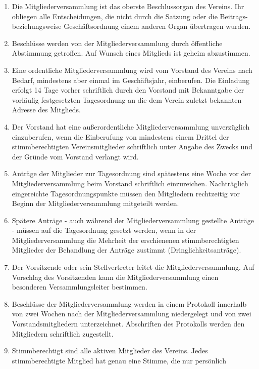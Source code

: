 \documentclass[german]{article}
\begin{document}
\begin{enumerate}
\def\labelenumi{\arabic{enumi}.}
\item
  Die Mitgliederversammlung ist das oberste Beschlussorgan des Vereins.
  Ihr obliegen alle Entscheidungen, die nicht durch die Satzung oder die
  Beitrags- beziehungsweise Geschäftsordnung einem anderen Organ
  übertragen wurden.
\item
  Beschlüsse werden von der Mitgliederversammlung durch öffentliche
  Abstimmung getroffen. Auf Wunsch eines Mitglieds ist geheim
  abzustimmen.
\item
  Eine ordentliche Mitgliederversammlung wird vom Vorstand des Vereins
  nach Bedarf, mindestens aber einmal im Geschäftsjahr, einberufen. Die
  Einladung erfolgt 14 Tage vorher schriftlich durch den Vorstand mit
  Bekanntgabe der vorläufig festgesetzten Tagesordnung an die dem Verein
  zuletzt bekannten Adresse des Mitglieds.
\item
  Der Vorstand hat eine außerordentliche Mitgliederversammlung
  unverzüglich einzuberufen, wenn die Einberufung von mindestens einem
  Drittel der stimmberechtigten Vereinsmitglieder schriftlich unter
  Angabe des Zwecks und der Gründe vom Vorstand verlangt wird.
\item
  Anträge der Mitglieder zur Tagesordnung sind spätestens eine Woche vor
  der Mitgliederversammlung beim Vorstand schriftlich einzureichen.
  Nachträglich eingereichte Tagesordnungspunkte müssen den Mitgliedern
  rechtzeitig vor Beginn der Mitgliederversammlung mitgeteilt werden.
\item
  Spätere Anträge - auch während der Mitgliederversammlung gestellte
  Anträge - müssen auf die Tagesordnung gesetzt werden, wenn in der
  Mitgliederversammlung die Mehrheit der erschienenen stimmberechtigten
  Mitglieder der Behandlung der Anträge zustimmt
  (Dringlichkeitsanträge).
\item
  Der Vorsitzende oder sein Stellvertreter leitet die
  Mitgliederversammlung. Auf Vorschlag des Vorsitzenden kann die
  Mitgliederversammlung einen besonderen Versammlungsleiter bestimmen.
\item
  Beschlüsse der Mitgliederversammlung werden in einem Protokoll
  innerhalb von zwei Wochen nach der Mitgliederversammlung niedergelegt
  und von zwei Vorstandsmitgliedern unterzeichnet. Abschriften des
  Protokolls werden den Mitgliedern schriftlich zugestellt.
\item
  Stimmberechtigt sind alle aktiven Mitglieder des Vereins. Jedes
  stimmberechtigte Mitglied hat genau eine Stimme, die nur persönlich

\end{enumerate}
\end{document}
